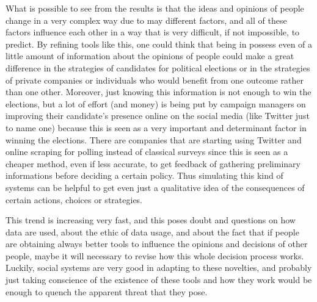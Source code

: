 \documentclass[11pt,a4paper,twocolumn]{article}
\begin{document}
What is possible to see from the results is that the ideas and opinions of people change in a very complex way due to may different factors, and all of these factors influence each other in a way that is very difficult, if not impossible, to predict.
By refining tools like this, one could think that being in possess even of a little amount of information about the opinions of people could make a great difference in the strategies of candidates for political elections or in the strategies of private companies or individuals who would benefit from one outcome rather than one other. Moreover, just knowing this information is not enough to win the elections, but a lot of effort (and money) is being put by campaign managers on improving their candidate's presence online on the social media (like Twitter just to name one) because this is seen as a very important and determinant factor in winning the elections.
There are companies that are starting using Twitter and online scraping for polling instead of classical surveys since this is seen as a cheaper method, even if less accurate, to get feedback of gathering preliminary informations before deciding a certain policy.
Thus simulating this kind of systems can be helpful to get even just a qualitative idea of the consequences of certain actions, choices or strategies.

This trend is increasing very fast, and this poses doubt and questions on how data are used, about the ethic of data usage, and about the fact that if people are obtaining always better tools to influence the opinions and decisions of other people, maybe it will necessary to revise how this whole decision process works.
Luckily, social systems are very good in adapting to these novelties, and probably just taking conscience of the existence of these tools and how they work would be enough to quench the apparent threat that they pose. 
\end{document}
